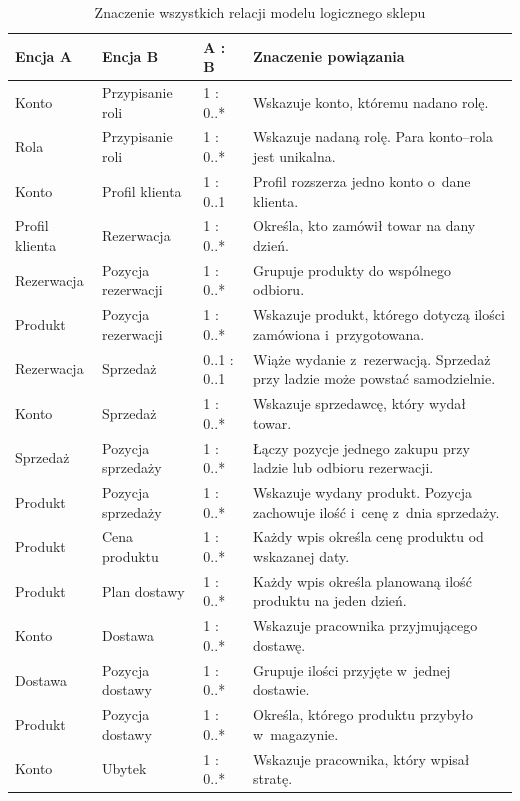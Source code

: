 \documentclass[12pt,a4paper,oneside]{article}
\newcounter{pu}
\begin{document}
\begin{table}[H]
    \centering
    \caption{Znaczenie wszystkich relacji modelu logicznego sklepu}
    \label{tab:zwiazki}
    \footnotesize
    \begin{tabularx}{\textwidth}{@{}L{2.65cm}L{3.25cm}L{1.8cm}>{\raggedright\arraybackslash}X@{}}
        \toprule
        Encja A & Encja B & A : B & Znaczenie powiązania \\
        \midrule
        Konto & Przypisanie roli & 1 : 0..* & Wskazuje konto, któremu nadano rolę. \\
        Rola & Przypisanie roli & 1 : 0..* & Wskazuje nadaną rolę. Para konto--rola jest unikalna. \\
        Konto & Profil klienta & 1 : 0..1 & Profil rozszerza jedno konto o~dane klienta. \\
        Profil klienta & Rezerwacja & 1 : 0..* & Określa, kto zamówił towar na dany dzień. \\
        Rezerwacja & Pozycja rezerwacji & 1 : 0..* & Grupuje produkty do wspólnego odbioru. \\
        Produkt & Pozycja rezerwacji & 1 : 0..* & Wskazuje produkt, którego dotyczą ilości zamówiona i~przygotowana. \\
        Rezerwacja & Sprzedaż & 0..1 : 0..1 & Wiąże wydanie z~rezerwacją. Sprzedaż przy ladzie może powstać samodzielnie. \\
        Konto & Sprzedaż & 1 : 0..* & Wskazuje sprzedawcę, który wydał towar. \\
        Sprzedaż & Pozycja sprzedaży & 1 : 0..* & Łączy pozycje jednego zakupu przy ladzie lub odbioru rezerwacji. \\
        Produkt & Pozycja sprzedaży & 1 : 0..* & Wskazuje wydany produkt. Pozycja zachowuje ilość i~cenę z~dnia sprzedaży. \\
        Produkt & Cena produktu & 1 : 0..* & Każdy wpis określa cenę produktu od wskazanej daty. \\
        Produkt & Plan dostawy & 1 : 0..* & Każdy wpis określa planowaną ilość produktu na jeden dzień. \\
        Konto & Dostawa & 1 : 0..* & Wskazuje pracownika przyjmującego dostawę. \\
        Dostawa & Pozycja dostawy & 1 : 0..* & Grupuje ilości przyjęte w~jednej dostawie. \\
        Produkt & Pozycja dostawy & 1 : 0..* & Określa, którego produktu przybyło w~magazynie. \\
        Konto & Ubytek & 1 : 0..* & Wskazuje pracownika, który wpisał stratę. \\

\end{tabularx}
\end{table}
\end{document}
